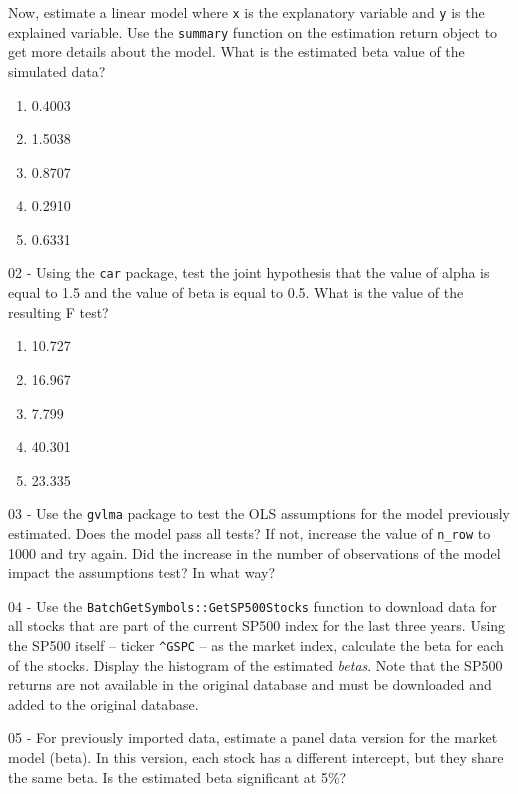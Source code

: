 \documentclass[
  12pt,
]{book}
\providecommand{\tightlist}{%
  \setlength{\itemsep}{0pt}\setlength{\parskip}{0pt}}
\begin{document}
Now, estimate a linear model where \texttt{x} is the explanatory variable and \texttt{y} is the explained variable. Use the \texttt{summary} function on the estimation return object to get more details about the model. What is the estimated beta value of the simulated data?

\begin{enumerate}
\def\labelenumi{\alph{enumi})}
\tightlist
\item
  0.4003
\item
  1.5038
\item
  0.8707
\item
  0.2910
\item
  0.6331
\end{enumerate}

02 -
Using the \texttt{car} package, test the joint hypothesis that the value of alpha is equal to 1.5 and the value of beta is equal to 0.5. What is the value of the resulting F test?

\begin{enumerate}
\def\labelenumi{\alph{enumi})}
\tightlist
\item
  10.727
\item
  16.967
\item
  7.799
\item
  40.301
\item
  23.335
\end{enumerate}

03 -
Use the \texttt{gvlma} package to test the OLS assumptions for the model previously estimated. Does the model pass all tests? If not, increase the value of \texttt{n\_row} to 1000 and try again. Did the increase in the number of observations of the model impact the assumptions test? In what way?

04 -
Use the \texttt{BatchGetSymbols::GetSP500Stocks} function to download data for all stocks that are part of the current SP500 index for the last three years. Using the SP500 itself -- ticker \texttt{\textquotesingle{}\^{}GSPC\textquotesingle{}} -- as the market index, calculate the beta for each of the stocks. Display the histogram of the estimated \emph{betas}. Note that the SP500 returns are not available in the original database and must be downloaded and added to the original database.

05 -
For previously imported data, estimate a panel data version for the market model (beta). In this version, each stock has a different intercept, but they share the same beta. Is the estimated beta significant at 5\%?
\end{document}
